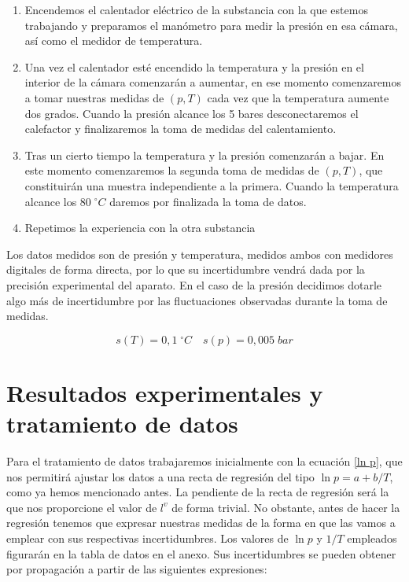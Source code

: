 \documentclass[a4paper,12pt,titlepage]{article}
\begin{document}
\begin{enumerate}
    \item Encendemos el calentador eléctrico de la substancia con la que estemos trabajando y preparamos el manómetro para medir la presión en esa cámara, así como el medidor de temperatura.
    \item Una vez el calentador esté encendido la temperatura y la presión en el interior de la cámara comenzarán a aumentar, en ese momento comenzaremos a tomar nuestras medidas de $(p,T)$ cada vez que la temperatura aumente dos grados. Cuando la presión alcance los 5 bares desconectaremos el calefactor y finalizaremos la toma de medidas del calentamiento.
    \item Tras un cierto tiempo la temperatura y la presión comenzarán a bajar. En este momento comenzaremos la segunda toma de medidas de $(p,T)$, que constituirán una muestra independiente a la primera. Cuando la temperatura alcance los $80 \;^{\circ}C$ daremos por finalizada la toma de datos.
    \item Repetimos la experiencia con la otra substancia
\end{enumerate}

\newpage

Los datos medidos son de presión y temperatura, medidos ambos con medidores digitales de forma directa, por lo que su incertidumbre vendrá dada por la precisión experimental del aparato. En el caso de la presión decidimos dotarle algo más de incertidumbre por las fluctuaciones observadas durante la toma de medidas.

\begin{equation}
    s(T) = 0,1 \; ^{\circ}C \quad s(p) = 0,005 \;bar
\end{equation}

\section{Resultados experimentales y tratamiento de datos}

Para el tratamiento de datos trabajaremos inicialmente con la ecuación \ref{ln p}, que nos permitirá ajustar los datos a una recta de regresión del tipo $\ln p = a + b/T$, como ya hemos mencionado antes. La pendiente de la recta de regresión será la que nos proporcione el valor de $l^v$ de forma trivial. No obstante, antes de hacer la regresión tenemos que expresar nuestras medidas de la forma en que las vamos a emplear con sus respectivas incertidumbres. Los valores de $\ln p$ y $1/T$ empleados figurarán en la tabla de datos en el anexo. Sus incertidumbres se pueden obtener por propagación a partir de las siguientes expresiones:
\end{document}

